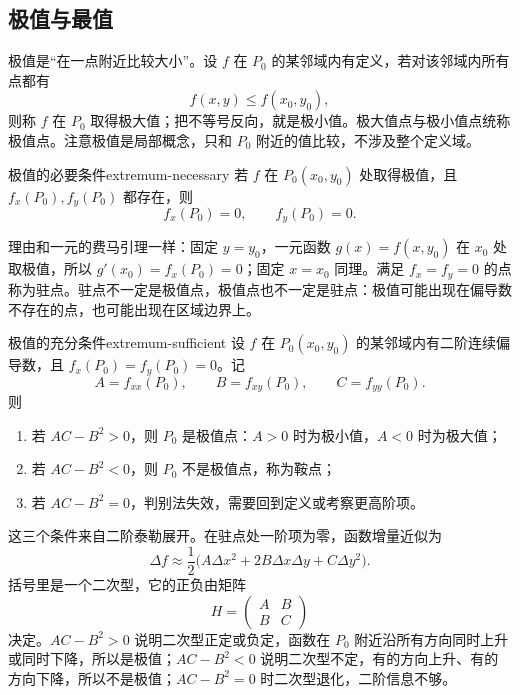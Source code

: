 \subsection{极值与最值}

极值是“在一点附近比较大小”。设 \(f\) 在 \(P_0\) 的某邻域内有定义，若对该邻域内所有点都有
\[
    f(x,y)\le f(x_0,y_0),
\]
则称 \(f\) 在 \(P_0\) 取得极大值；把不等号反向，就是极小值。极大值点与极小值点统称极值点。注意极值是局部概念，只和 \(P_0\) 附近的值比较，不涉及整个定义域。

\begin{conclusion}{极值的必要条件}{extremum-necessary}
    若 \(f\) 在 \(P_0(x_0,y_0)\) 处取得极值，且 \(f_x(P_0),f_y(P_0)\) 都存在，则
    \[
        f_x(P_0)=0,\qquad f_y(P_0)=0.
    \]
\end{conclusion}

理由和一元的费马引理一样：固定 \(y=y_0\)，一元函数 \(g(x)=f(x,y_0)\) 在 \(x_0\) 处取极值，所以 \(g'(x_0)=f_x(P_0)=0\)；固定 \(x=x_0\) 同理。满足 \(f_x=f_y=0\) 的点称为驻点。驻点不一定是极值点，极值点也不一定是驻点：极值可能出现在偏导数不存在的点，也可能出现在区域边界上。

\begin{conclusion}{极值的充分条件}{extremum-sufficient}
    设 \(f\) 在 \(P_0(x_0,y_0)\) 的某邻域内有二阶连续偏导数，且 \(f_x(P_0)=f_y(P_0)=0\)。记
    \[
        A=f_{xx}(P_0),\qquad B=f_{xy}(P_0),\qquad C=f_{yy}(P_0).
    \]
    则
    \begin{enumerate}
        \item 若 \(AC-B^2>0\)，则 \(P_0\) 是极值点：\(A>0\) 时为极小值，\(A<0\) 时为极大值；
        \item 若 \(AC-B^2<0\)，则 \(P_0\) 不是极值点，称为鞍点；
        \item 若 \(AC-B^2=0\)，判别法失效，需要回到定义或考察更高阶项。
    \end{enumerate}
\end{conclusion}

这三个条件来自二阶泰勒展开。在驻点处一阶项为零，函数增量近似为
\[
    \Delta f\approx\frac12
    \bigl(A\Delta x^2+2B\Delta x\Delta y+C\Delta y^2\bigr).
\]
括号里是一个二次型，它的正负由矩阵
\[
    H=\begin{pmatrix}A&B\\ B&C\end{pmatrix}
\]
决定。\(AC-B^2>0\) 说明二次型正定或负定，函数在 \(P_0\) 附近沿所有方向同时上升或同时下降，所以是极值；\(AC-B^2<0\) 说明二次型不定，有的方向上升、有的方向下降，所以不是极值；\(AC-B^2=0\) 时二次型退化，二阶信息不够。

